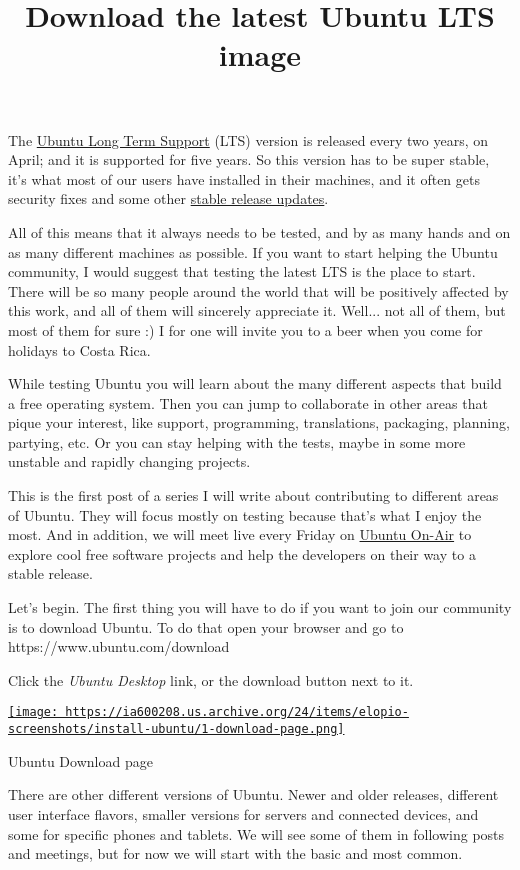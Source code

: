 \documentclass[12pt]{article}
\title{Download the latest Ubuntu LTS image}
\begin{document}
The \href{https://wiki.ubuntu.com/LTS}{Ubuntu Long Term Support} (LTS) version
is released every two years, on April; and it is supported for five years. So
this version has to be super stable, it's what most of our users have installed
in their machines, and it often gets security fixes and some other
\href{https://wiki.ubuntu.com/StableReleaseUpdates}{stable release updates}.

All of this means that it always needs to be tested, and by as many hands and on
as many different machines as possible. If you want to start helping the Ubuntu
community, I would suggest that testing the latest LTS is the place to start.
There will be so many people around the world that will be positively affected
by this work, and all of them will sincerely appreciate it. Well... not all of
them, but most of them for sure :) I for one will invite you to a beer when you
come for holidays to Costa Rica.

While testing Ubuntu you will learn about the many different aspects that build
a free operating system. Then you can jump to collaborate in other areas that
pique your interest, like support, programming, translations, packaging,
planning, partying, etc. Or you can stay helping with the tests, maybe in some
more unstable and rapidly changing projects.

This is the first post of a series I will write about contributing to different
areas of Ubuntu. They will focus mostly on testing because that's what I enjoy
the most. And in addition, we will meet live every Friday on
\href{http://ubuntuonair.com/}{Ubuntu On-Air} to explore cool free software
projects and help the developers on their way to a stable release.

Let's begin. The first thing you will have to do if you want to join our
community is to download Ubuntu. To do that open your browser and go to
https://www.ubuntu.com/download

Click the \emph{Ubuntu Desktop} link, or the download button next to it.

\begin{center}
  \href{
    https://ia600208.us.archive.org/24/items/elopio-screenshots/install-ubuntu/1-download-page.png}{
    \texttt{[image: 
    https://ia600208.us.archive.org/24/items/elopio-screenshots/install-ubuntu/1-download-page.png]}
  }
  \caption{Ubuntu Download page}
\end{center}

There are other different versions of Ubuntu. Newer and older releases,
different user interface flavors, smaller versions for servers and connected
devices, and some for specific phones and tablets. We will see some of them
in following posts and meetings, but for now we will start with the basic and
most common.
\end{document}
